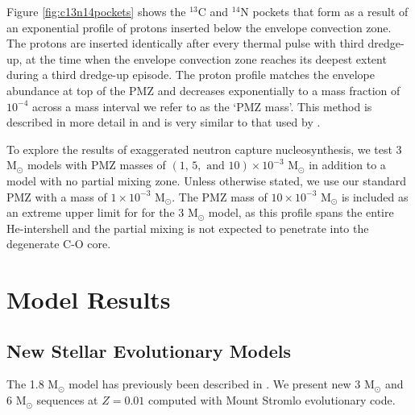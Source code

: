 Figure \ref{fig:c13n14pockets} shows the $^{13}$C and $^{14}$N pockets that form as a result of an exponential profile of protons inserted below the envelope convection zone. The protons are inserted identically after every thermal pulse with third dredge-up, at the time when the envelope convection zone reaches its deepest extent during a third dredge-up episode. The proton profile matches the envelope abundance at top of the PMZ and decreases exponentially to a mass fraction of $10^{-4}$ across a mass interval we refer to as the `PMZ mass'. This method is described in more detail in \citet{Lugaro:2004en} and is very similar to that used by \citet{Goriely:2000vs}. 

To explore the results of exaggerated neutron capture nucleosynthesis, we test 3 M$_\odot$ models with PMZ masses of $(1,\,5,\mbox{ and }10) \times 10^{-3}$ M$_\odot$ in addition to a model with no partial mixing zone. Unless otherwise stated, we use our standard PMZ with a mass of $1\times 10^{-3}$ M$_\odot$. The PMZ mass of $10 \times 10^{-3}$ M$_\odot$ is included as an extreme upper limit for for the 3 M$_\odot$ model, as this profile spans the entire He-intershell and the partial mixing is not expected to penetrate into the degenerate C-O core.

\section{Model Results}

\subsection{New Stellar Evolutionary Models}
The 1.8 M$_\odot$ model has previously been described in \citet{Karakas:2010dk}. We present new 3 M$_\odot$ and 6 M$_\odot$ sequences at $Z=0.01$ computed with Mount Stromlo evolutionary code.

